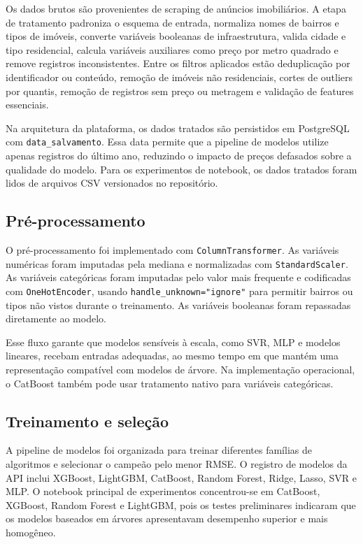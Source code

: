 \documentclass[12pt,a4paper]{article}
\begin{document}
Os dados brutos são provenientes de scraping de anúncios imobiliários. A etapa de tratamento padroniza o esquema de entrada, normaliza nomes de bairros e tipos de imóveis, converte variáveis booleanas de infraestrutura, valida cidade e tipo residencial, calcula variáveis auxiliares como preço por metro quadrado e remove registros inconsistentes. Entre os filtros aplicados estão deduplicação por identificador ou conteúdo, remoção de imóveis não residenciais, cortes de outliers por quantis, remoção de registros sem preço ou metragem e validação de features essenciais.

Na arquitetura da plataforma, os dados tratados são persistidos em PostgreSQL com \texttt{data\_salvamento}. Essa data permite que a pipeline de modelos utilize apenas registros do último ano, reduzindo o impacto de preços defasados sobre a qualidade do modelo. Para os experimentos de notebook, os dados tratados foram lidos de arquivos CSV versionados no repositório.

\subsection{Pré-processamento}

O pré-processamento foi implementado com \texttt{ColumnTransformer}. As variáveis numéricas foram imputadas pela mediana e normalizadas com \texttt{StandardScaler}. As variáveis categóricas foram imputadas pelo valor mais frequente e codificadas com \texttt{OneHotEncoder}, usando \texttt{handle\_unknown="ignore"} para permitir bairros ou tipos não vistos durante o treinamento. As variáveis booleanas foram repassadas diretamente ao modelo.

Esse fluxo garante que modelos sensíveis à escala, como SVR, MLP e modelos lineares, recebam entradas adequadas, ao mesmo tempo em que mantém uma representação compatível com modelos de árvore. Na implementação operacional, o CatBoost também pode usar tratamento nativo para variáveis categóricas.

\subsection{Treinamento e seleção}

A pipeline de modelos foi organizada para treinar diferentes famílias de algoritmos e selecionar o campeão pelo menor RMSE. O registro de modelos da API inclui XGBoost, LightGBM, CatBoost, Random Forest, Ridge, Lasso, SVR e MLP. O notebook principal de experimentos concentrou-se em CatBoost, XGBoost, Random Forest e LightGBM, pois os testes preliminares indicaram que os modelos baseados em árvores apresentavam desempenho superior e mais homogêneo.
\end{document}
